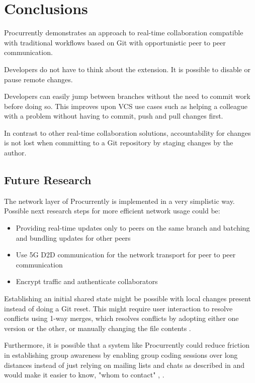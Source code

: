 \chapter{Conclusions}

Procurrently demonstrates an approach to real-time collaboration compatible with traditional workflows based on Git with opportunistic peer to peer communication. 

Developers do not have to think about the extension. It is possible to disable or pause remote changes. 

Developers can easily jump between branches without the need to commit work before doing so. This improves upon VCS use cases such as helping a colleague with a problem without having to commit, push and pull changes first. 

In contrast to other real-time collaboration solutions, accountability for changes is not lost when committing to a Git repository by staging changes by the author.

\section{Future Research}

The network layer of Procurrently is implemented in a very simplistic way.
Possible next research steps for more efficient network usage could be:

\begin{itemize}
    \item Providing real-time updates only to peers on the same branch and batching and bundling updates for other peers
    \item Use 5G D2D communication for the network transport for peer to peer communication \cite{TehraniUysalYanikomeroglu:2014:Device-to-devicecommunicationin5G}
    \item Encrypt traffic and authenticate collaborators
\end{itemize}

Establishing an initial shared state might be possible with local changes present instead of doing a Git reset. This might require user interaction to resolve conflicts using 1-way merges, which resolves conflicts by adopting either one version or the other, or manually changing the file contents \cite{7070484}.

Furthermore, it is possible that a system like Procurrently could reduce friction in establishing group awareness by enabling group coding sessions over long distances instead of just relying on mailing lists and chats as described in \cite{Gutwin:2004:GAD:1031607.1031621} and would make it easier to know, "whom to contact" \cite{795103}, \cite{Gutwin:2004:GAD:1031607.1031621}.

